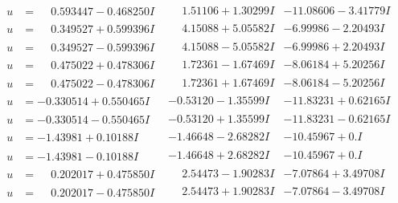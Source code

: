 \documentclass[1p]{elsarticle_modified}
\theoremstyle{definition}
\begin{document}
$$\begin{array}{c|c|c}
\begin{aligned}
u &= \phantom{-}0.593447 - 0.468250 I\end{aligned}
 & \phantom{-}1.51106 + 1.30299 I & -11.08606 - 3.41779 I \\ \hline\begin{aligned}
u &= \phantom{-}0.349527 + 0.599396 I\end{aligned}
 & \phantom{-}4.15088 + 5.05582 I & -6.99986 - 2.20493 I \\ \hline\begin{aligned}
u &= \phantom{-}0.349527 - 0.599396 I\end{aligned}
 & \phantom{-}4.15088 - 5.05582 I & -6.99986 + 2.20493 I \\ \hline\begin{aligned}
u &= \phantom{-}0.475022 + 0.478306 I\end{aligned}
 & \phantom{-}1.72361 - 1.67469 I & -8.06184 + 5.20256 I \\ \hline\begin{aligned}
u &= \phantom{-}0.475022 - 0.478306 I\end{aligned}
 & \phantom{-}1.72361 + 1.67469 I & -8.06184 - 5.20256 I \\ \hline\begin{aligned}
u &= -0.330514 + 0.550465 I\end{aligned}
 & -0.53120 - 1.35599 I & -11.83231 + 0.62165 I \\ \hline\begin{aligned}
u &= -0.330514 - 0.550465 I\end{aligned}
 & -0.53120 + 1.35599 I & -11.83231 - 0.62165 I \\ \hline\begin{aligned}
u &= -1.43981 + 0.10188 I\end{aligned}
 & -1.46648 - 2.68282 I & -10.45967 + 0. I\phantom{ +0.000000I} \\ \hline\begin{aligned}
u &= -1.43981 - 0.10188 I\end{aligned}
 & -1.46648 + 2.68282 I & -10.45967 + 0. I\phantom{ +0.000000I} \\ \hline\begin{aligned}
u &= \phantom{-}0.202017 + 0.475850 I\end{aligned}
 & \phantom{-}2.54473 - 1.90283 I & -7.07864 + 3.49708 I \\ \hline\begin{aligned}
u &= \phantom{-}0.202017 - 0.475850 I\end{aligned}
 & \phantom{-}2.54473 + 1.90283 I & -7.07864 - 3.49708 I \\ \hline\begin{aligned}

\end{aligned}
\end{array}$$
\end{document}
